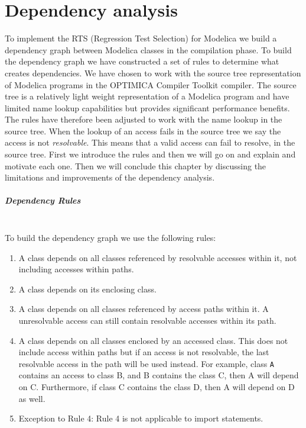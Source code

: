 \documentclass{cslthse-msc}
\begin{document}
\chapter[Dependency analysis]{Dependency analysis}
To implement the RTS (Regression Test Selection) for Modelica we build a dependency graph between Modelica classes in the compilation phase. To build the dependency graph we have constructed a set of rules to determine what creates dependencies. We have chosen to work with the source tree representation of Modelica programs in the OPTIMICA Compiler Toolkit compiler. The source tree is a relatively light weight representation of a Modelica program and have limited name lookup capabilities but provides significant performance benefits. The rules have therefore been adjusted to work with the name lookup in the source tree. When the lookup of an access fails in the source tree we say the access is not \emph{resolvable}. This means that a valid access can fail to resolve, in the source tree. First we introduce the rules and then we will go on and explain and motivate each one. Then we will conclude this chapter by discussing the limitations and improvements of the dependency analysis.

\paragraph{Dependency Rules}\mbox{}\\
To build the dependency graph we use the following rules:
\begin{enumerate}
\item A class depends on all classes referenced by resolvable accesses within it, not including accesses within paths.
\item A class depends on its enclosing class. 
\item A class depends on all classes referenced by access paths within it. A unresolvable access can still contain resolvable accesses within its path.
\item A class depends on all classes enclosed by an accessed class. This does not include access within paths but if an access is not resolvable, the last resolvable access in the path will be used instead.
For example, class \texttt{A} contains an access to class B, and B contains the class C, then A will depend on C. Furthermore, if class C contains the class D, then A will depend on D as well.
\item Exception to Rule 4: Rule 4 is not applicable to import statements.
\end{enumerate}
\end{document}
